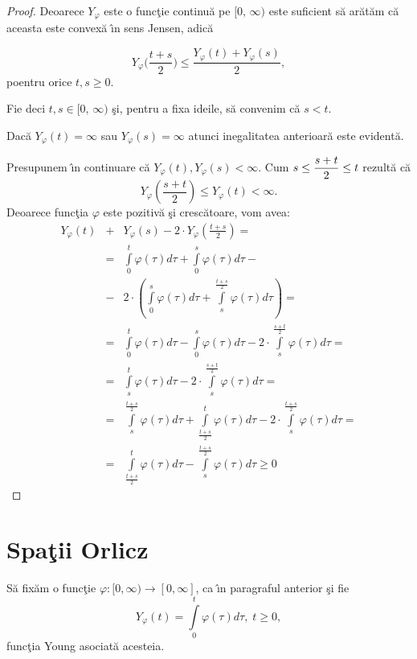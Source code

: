\documentclass[ a4paper, 12pt]{report}
\theoremstyle{definition}
\theoremstyle{remark}
\numberwithin{equation}{section}
\begin{document}
\begin{proof} Deoarece $Y_\varphi$ este o func\c tie continu\u a pe $[0,\, \infty)$ este suficient s\u a ar\u at\u am c\u a aceasta este convex\u a \^\i n sens Jensen, adic\u a

$$Y_\varphi\Big(\frac{t+s}{2}\Big)\leq \frac{Y_\varphi(t) + Y_\varphi (s)}{2},$$  poentru orice $t,s\geq 0$.

Fie deci $t, s \in [0, \, \infty)$ \c si, pentru a fixa ideile, s\u a convenim c\u a $s < t$.

Dac\u a $Y_\varphi (t) = \infty$ sau $Y_\varphi (s) = \infty$ atunci inegalitatea anterioar\u a este evident\u a.

Presupunem \^\i n continuare c\u a $Y_\varphi (t),Y_\varphi (s) < \infty$. Cum $s\leq \displaystyle\frac{s+t}{2} \leq t$ rezult\u a c\u a
$$Y_\varphi (\frac{s+t}{2}) \leq Y_\varphi (t)<\infty.$$
Deoarece func\c tia $\varphi$ este pozitiv\u a \c si cresc\u atoare, vom avea:
\begin{eqnarray*}
Y_\varphi (t) &+& Y_\varphi (s) - 2 \cdot Y_\varphi (\frac{t+s}{2})=\\
&=&\int\limits_{0}^{t} \varphi(\tau)d\tau + \int\limits_{0}^{s} \varphi(\tau)d\tau - \\
&-&2 \cdot \left(\int\limits_{0}^{s} \varphi(\tau)d\tau + \int\limits_{s}^{\frac{t+s}{2}} \varphi(\tau)d\tau\right)=\\
&=&\int\limits_{0}^{t} \varphi(\tau)d\tau - \int\limits_{0}^{s} \varphi(\tau)d\tau - 2 \cdot \int\limits_{s}^{\frac{s+t}{2}} \varphi(\tau)d\tau =\\
&=&\int\limits_{s}^{t} \varphi(\tau)d\tau - 2 \cdot\int\limits_{s}^{\frac{s+t}{2}} \varphi(\tau)d\tau=\\
&=&\int\limits_{s}^{\frac{t+s}{2}} \varphi(\tau)d\tau + \int\limits_{\frac{t+s}{2}}^{t} \varphi(\tau)d\tau - 2 \cdot \int\limits_{s}^{\frac{t+s}{2}}\varphi(\tau)d\tau=\\
&=&\int\limits_{\frac{t+s}{2}}^{t} \varphi(\tau)d\tau - \int\limits_{s}^{\frac{t+s}{2}} \varphi(\tau)d\tau \geq 0
\end{eqnarray*}

\end{proof}


\newpage


\section{Spa\c tii Orlicz}

S\u a fix\u am o func\c tie $\varphi : [0,\infty) \rightarrow [0,\infty]$, ca \^\i n paragraful anterior \c si fie
$$Y_\varphi (t)=\int\limits_{0}^{t} \varphi (\tau) d\tau, \; t \geq 0,$$ func\c tia Young asociat\u a acesteia.
\end{document}
